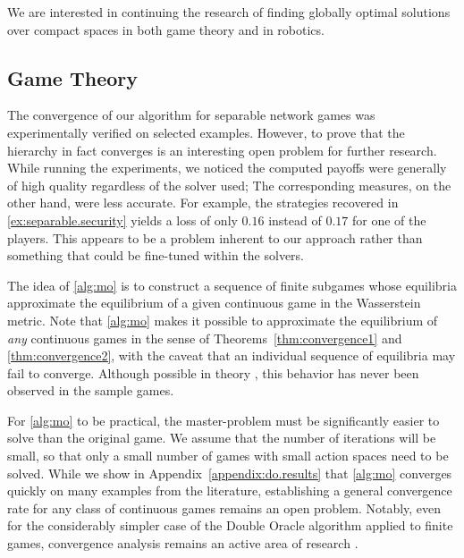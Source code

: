 \documentclass[../main.tex]{subfiles}
\begin{document}
We are interested in continuing the research of finding globally optimal solutions over compact spaces in both game theory and in robotics.


\subsection*{Game Theory}
The convergence of our algorithm for separable network games was experimentally verified on selected examples. However, to prove that the hierarchy in fact converges is an interesting open problem for further research. While running the experiments, we noticed the computed payoffs were generally of high quality regardless of the solver used; The corresponding measures, on the other hand, were less accurate. For example, the strategies recovered in \cref{ex:separable.security} yields a loss of only $0.16$ instead of $0.17$ for one of the players. This appears to be a problem inherent to our approach rather than something that could be fine-tuned within the solvers.

The idea of \cref{alg:mo} is to construct a sequence of finite subgames whose equilibria approximate the equilibrium of a given continuous game in the Wasserstein metric. Note that \cref{alg:mo} makes it possible to approximate the equilibrium of \emph{any} continuous games in the sense of Theorems~\ref{thm:convergence1} and \ref{thm:convergence2}, with the caveat that an individual sequence of equilibria may fail to converge. Although possible in theory \cite{adam.horčík.ea:double}, this behavior has never been observed in the sample games.

For \cref{alg:mo} to be practical, the master-problem must be significantly easier to solve than the original game. We assume that the number of iterations will be small, so that only a small number of games with small action spaces need to be solved. While we show in Appendix~\ref{appendix:do.results} that \cref{alg:mo} converges quickly on many examples from the literature, establishing a general convergence rate for any class of continuous games remains an open problem. Notably, even for the considerably simpler case of the Double Oracle algorithm applied to finite games, convergence analysis remains an active area of research \cite{dziwoki2025perturbingbestresponseszerosum}.
\end{document}
